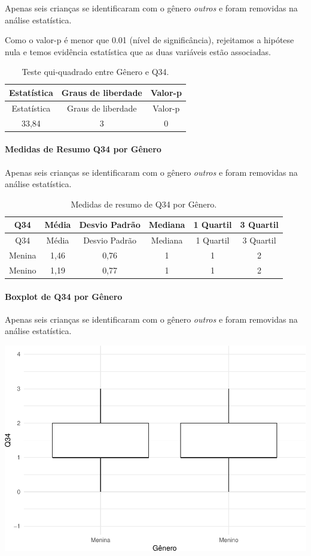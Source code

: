 \documentclass[]{article}
\let\oldparagraph\paragraph
\renewcommand{\paragraph}[1]{\oldparagraph{#1}\mbox{}}
\begin{document}
Apenas seis crianças se identificaram com o gênero \emph{outros} e foram removidas na análise estatística.

Como o valor-p é menor que 0.01 (nível de significância), rejeitamos a hipótese nula e temos evidência estatística que as duas variáveis estão associadas.

\begin{longtable}[]{@{}ccc@{}}
\caption{\label{tab:unnamed-chunk-1205}Teste qui-quadrado entre Gênero e Q34.}\tabularnewline
\toprule
Estatística & Graus de liberdade & Valor-p\tabularnewline
\midrule
\endfirsthead
\toprule
Estatística & Graus de liberdade & Valor-p\tabularnewline
\midrule
\endhead
33,84 & 3 & 0\tabularnewline
\bottomrule
\end{longtable}

\cleardoublepage

\hypertarget{medidas-de-resumo-q34-por-guxeanero}{%
\paragraph{Medidas de Resumo Q34 por Gênero}\label{medidas-de-resumo-q34-por-guxeanero}}

Apenas seis crianças se identificaram com o gênero \emph{outros} e foram removidas na análise estatística.

\begin{longtable}[]{@{}cccccc@{}}
\caption{\label{tab:unnamed-chunk-1206}Medidas de resumo de Q34 por Gênero.}\tabularnewline
\toprule
Q34 & Média & Desvio Padrão & Mediana & 1 Quartil & 3 Quartil\tabularnewline
\midrule
\endfirsthead
\toprule
Q34 & Média & Desvio Padrão & Mediana & 1 Quartil & 3 Quartil\tabularnewline
\midrule
\endhead
Menina & 1,46 & 0,76 & 1 & 1 & 2\tabularnewline
Menino & 1,19 & 0,77 & 1 & 1 & 2\tabularnewline
\bottomrule
\end{longtable}

\hypertarget{boxplot-de-q34-por-guxeanero}{%
\paragraph{Boxplot de Q34 por Gênero}\label{boxplot-de-q34-por-guxeanero}}

Apenas seis crianças se identificaram com o gênero \emph{outros} e foram removidas na análise estatística.

\begin{center}\includegraphics[width=0.75\linewidth]{relatorio_covid19_files/figure-latex/unnamed-chunk-1207-1} \end{center}
\end{document}
